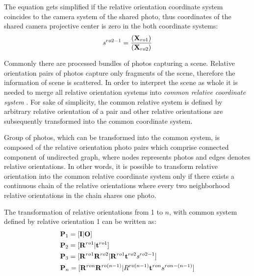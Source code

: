 \documentclass[a4paper,12pt]{article}
\newcommand{\ematr}[1]{
{\bf #1}
}
\newcommand{\evect}[1]{
{\bf #1}
}
\newcommand{\escal}[1]{
{\it #1}
}
\newcommand{\term}[1]{
{\it #1}
}
\begin{document}

The equation gets simplified if the relative orientation coordinate system coincides to the camera system of the shared photo, thus 
coordinates of the shared camera projective center is zero in the both coordinate systems: 
\begin{equation}
\escal{s}^{ro2-1} = \frac{\mathbf(\evect{X}_{ro1})}
	                 {\mathbf(\evect{X}_{ro2})}
\end{equation}


Commonly there are processed bundles of photos capturing a scene. Relative orientation pairs of photos capture only fragments of the scene, 
therefore the information of scene is scattered.  
In order to interpret the scene as whole it is needed to merge all relative orientation systems into \term{common relative coordinate system}.
For sake of simplicity, the common relative system is defined by arbitrary relative orientation of a pair and other 
relative orientations are subsequently transformed into the common coordinate system. 


Group of photos, which can be transformed into the common system, is composed of the relative orientation photo pairs
which comprise connected component of undirected graph, where nodes represents  photos and edges denotes relative orientations. 
In other words, it is possible to transform relative orientation into the common relative coordinate system only if there 
exists a continuous chain of the relative orientations where every two neighborhood relative orientations in the chain shares one photo.

The transformation of relative orientations from 1 to $n$, with common system defined by relative orientation 1 can be written as: 
\begin{equation}
\label{eq:comm_rel}
\begin{split}
&\ematr{P}_{1} = [\ematr{I}|\evect{O}] \\
&\ematr{P}_{2} = [\ematr{R}^{ro1}|\evect{t}^{ro1}] \\
&\ematr{P}_{3} = [\ematr{R}^{ro1} \ematr{R}^{ro2}| \ematr{R}^{ro1} \evect{t}^{ro2} \escal{s}^{ro2-1}] \\
&\ematr{P}_{n} = [\ematr{R}^{ron} \ematr{R}^{ro(n - 1)}| R^{ro(n - 1)} \evect{t}^{ron} {s}^{ron- (n-1)}] \\
\end{split}
\end{equation}
\end{document}
